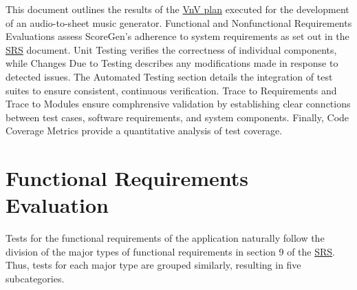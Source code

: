 \documentclass[12pt, titlepage]{article}
\begin{document}
\tableofcontents

\listoftables %

\listoffigures %

\newpage


This document outlines the results of the 
\href{https://github.com/emilyperica/ScoreGen/blob/main/docs/VnVPlan/VnVPlan.pdf}{VnV plan}
executed for the development of an audio-to-sheet music generator. 
Functional and Nonfunctional Requirements Evaluations assess ScoreGen's 
adherence to system requirements as set out in the \href{https://github.com/emilyperica/ScoreGen/blob/main/docs/SRS-Volere/SRS.pdf}{SRS} document. 
Unit Testing verifies the correctness of individual components, while Changes 
Due to Testing describes any modifications made in response to detected issues. 
The Automated Testing section details the integration of test suites to ensure 
consistent, continuous verification. Trace to Requirements and Trace to Modules 
ensure comphrensive validation by establishing clear connctions between test 
cases, software requirements, and system components. Finally, Code Coverage Metrics 
provide a quantitative analysis of test coverage.

\section{Functional Requirements Evaluation}
\label{fr}
Tests for the functional requirements of the application naturally follow the division of the major types of functional requirements
in section 9 of the \href{https://github.com/emilyperica/ScoreGen/blob/main/docs/SRS-Volere/SRS.pdf}{SRS}. Thus, tests for each major 
type are grouped similarly, resulting in five subcategories.
\end{document}
